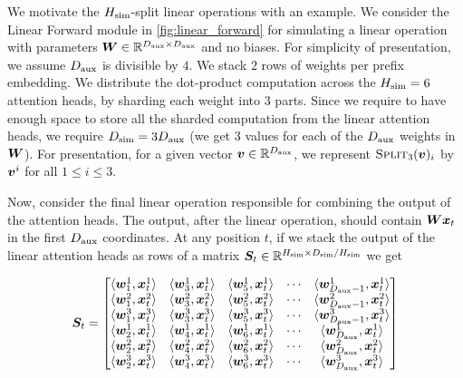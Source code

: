 We motivate the $H_{\text{sim}}$-split linear operations with an example. We consider the Linear Forward module in \cref{fig:linear_forward} for simulating a linear operation with parameters ${\bm{W}} \in \mathbb{R}^{D_{\text{aux}} \times D_{\text{aux}}}$ and no biases. For simplicity of presentation, we assume $D_{\text{aux}}$ is divisible by $4$. We stack $2$ rows of weights per prefix embedding. We distribute the dot-product computation across the $H_{\text{sim}}=6$ attention heads, by sharding each weight into $3$ parts. Since we require to have enough space to store all the sharded computation from the linear attention heads, we require $D_{\text{sim}} = 3 D_{\text{aux}}$ (we get $3$ values for each of the $D_{\text{aux}}$ weights in ${\bm{W}}$). 
For presentation, for a given vector ${\bm{v}} \in \mathbb{R}^{D_{\text{aux}}}$, we represent $\textsc{Split}_{3} ({\bm{v}})_i$ by ${\bm{v}}^i$ for all $1 \le i \le 3$.


Now, consider the final linear operation responsible for combining the output of the attention heads. The output, after the linear operation, should contain ${\bm{W}} {\bm{x}}_t$ in the first $D_{\text{aux}}$ coordinates.
At any position $t$, if we stack the output of the linear attention heads as rows of a matrix ${\bm{S}}_t \in \mathbb{R}^{ H_{\text{sim}} \times D_{\text{sim}} / H_{\text{sim}} }$ we get

\begin{align*}
    {\bm{S}}_t  = \begin{bmatrix}
     \langle {\bm{w}}_1^1, {\bm{x}}_t^1 \rangle & \langle {\bm{w}}_3^1, {\bm{x}}_t^1 \rangle & \langle {\bm{w}}_5^1, {\bm{x}}_t^1 \rangle  & \cdots & \langle {\bm{w}}_{D_{\text{aux}}-1}^1, {\bm{x}}_t^1 \rangle  \\
     \langle {\bm{w}}_1^2, {\bm{x}}_t^2 \rangle & \langle {\bm{w}}_3^2, {\bm{x}}_t^2 \rangle & \langle {\bm{w}}_5^2, {\bm{x}}_t^2 \rangle  & \cdots & \langle {\bm{w}}_{D_{\text{aux}}-1}^2, {\bm{x}}_t^2 \rangle \\
     \langle {\bm{w}}_1^3, {\bm{x}}_t^3 \rangle & \langle {\bm{w}}_3^3, {\bm{x}}_t^3 \rangle & \langle {\bm{w}}_5^3, {\bm{x}}_t^3 \rangle  & \cdots & \langle {\bm{w}}_{D_{\text{aux}}-1}^3, {\bm{x}}_t^3 \rangle \\
     \langle {\bm{w}}_2^1, {\bm{x}}_t^1 \rangle & \langle {\bm{w}}_4^1, {\bm{x}}_t^1 \rangle & \langle {\bm{w}}_6^1, {\bm{x}}_t^1 \rangle  & \cdots & \langle {\bm{w}}_{D_{\text{aux}}}^1, {\bm{x}}_t^1 \rangle  \\
     \langle {\bm{w}}_2^2, {\bm{x}}_t^2 \rangle & \langle {\bm{w}}_4^2, {\bm{x}}_t^2 \rangle & \langle {\bm{w}}_6^2, {\bm{x}}_t^2 \rangle  & \cdots & \langle {\bm{w}}_{D_{\text{aux}}}^2, {\bm{x}}_t^2 \rangle\\
     \langle {\bm{w}}_2^3, {\bm{x}}_t^3 \rangle & \langle {\bm{w}}_4^3, {\bm{x}}_t^3 \rangle & \langle {\bm{w}}_6^3, {\bm{x}}_t^3 \rangle  & \cdots & \langle {\bm{w}}_{D_{\text{aux}}}^3, {\bm{x}}_t^3 \rangle
\end{bmatrix}
\end{align*}


